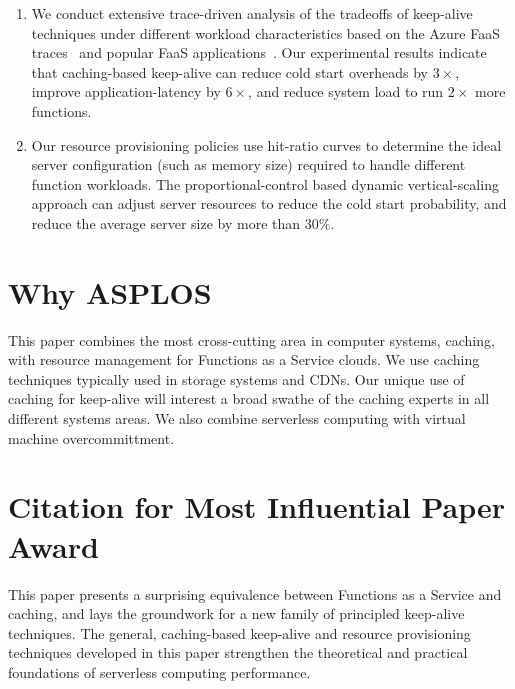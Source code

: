 \documentclass[pageno]{jpaper}
\begin{document}
\begin{enumerate}
\item  We conduct extensive trace-driven analysis of the tradeoffs of keep-alive techniques under different workload characteristics based on the Azure FaaS traces~\cite{shahrad_serverless_2020} and popular FaaS applications~\cite{kim_functionbench_2019}. 
    Our experimental results indicate that caching-based keep-alive can reduce cold start overheads by $3\times$,
  improve application-latency by $6\times$,
  and reduce system load to run $2\times$ more functions.
  \item Our resource provisioning policies use hit-ratio curves to determine the ideal server configuration (such as memory size) required to handle different function workloads. The proportional-control based dynamic vertical-scaling approach can adjust server resources to reduce the cold start probability, and reduce the average server size by more than $30\%$. 

\end{enumerate}



\section{Why ASPLOS}
\vspace*{\subsecspace}
This paper combines the most cross-cutting area in computer systems, caching, with resource management for Functions as a Service clouds. 
We use caching techniques typically used in storage systems and CDNs. 
Our unique use of caching for keep-alive will interest a broad swathe of the caching experts in all different systems areas.
We also combine serverless computing with virtual machine overcommittment. 

\section{Citation for Most Influential Paper Award}
\vspace*{\subsecspace}

This paper presents a surprising equivalence between Functions as a Service and caching, and lays the groundwork for a new family of principled keep-alive techniques. 
The general, caching-based keep-alive and resource provisioning techniques developed in this paper strengthen the theoretical and practical foundations of serverless computing performance. 




\end{document}
